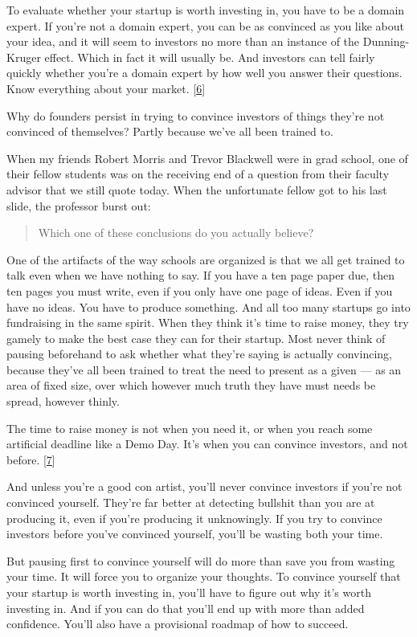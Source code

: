 To evaluate whether your startup is worth investing in, you have to be a
domain expert. If you're not a domain expert, you can be as convinced as
you like about your idea, and it will seem to investors no more than an
instance of the Dunning-Kruger effect. Which in fact it will usually be.
And investors can tell fairly quickly whether you're a domain expert by
how well you answer their questions. Know everything about your market.
{[}\hyperref[f6n]{6}{]}

Why do founders persist in trying to convince investors of things
they're not convinced of themselves? Partly because we've all been
trained to.

When my friends Robert Morris and Trevor Blackwell were in grad school,
one of their fellow students was on the receiving end of a question from
their faculty advisor that we still quote today. When the unfortunate
fellow got to his last slide, the professor burst out:

\begin{quote}
Which one of these conclusions do you actually believe?
\end{quote}

One of the artifacts of the way schools are organized is that we all get
trained to talk even when we have nothing to say. If you have a ten page
paper due, then ten pages you must write, even if you only have one page
of ideas. Even if you have no ideas. You have to produce something. And
all too many startups go into fundraising in the same spirit. When they
think it's time to raise money, they try gamely to make the best case
they can for their startup. Most never think of pausing beforehand to
ask whether what they're saying is actually convincing, because they've
all been trained to treat the need to present as a given --- as an area
of fixed size, over which however much truth they have must needs be
spread, however thinly.

The time to raise money is not when you need it, or when you reach some
artificial deadline like a Demo Day. It's when you can convince
investors, and not before. {[}\hyperref[f7n]{7}{]}

And unless you're a good con artist, you'll never convince investors if
you're not convinced yourself. They're far better at detecting bullshit
than you are at producing it, even if you're producing it unknowingly.
If you try to convince investors before you've convinced yourself,
you'll be wasting both your time.

But pausing first to convince yourself will do more than save you from
wasting your time. It will force you to organize your thoughts. To
convince yourself that your startup is worth investing in, you'll have
to figure out why it's worth investing in. And if you can do that you'll
end up with more than added confidence. You'll also have a provisional
roadmap of how to succeed.

